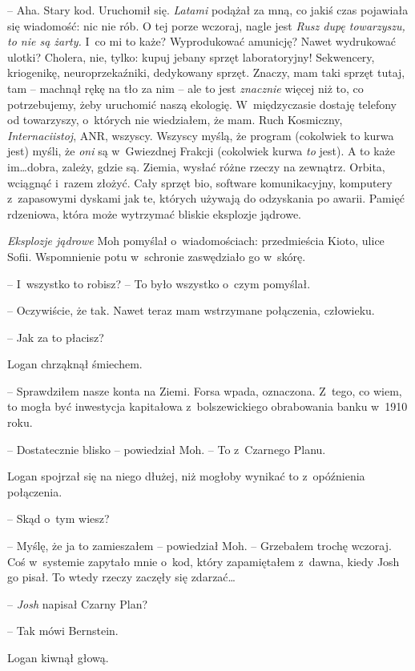 \documentclass[oneside,polish,11pt,sfheadings]{mwbk}
\begin{document}
-- Aha. Stary kod. Uruchomił się. \emph{Latami} podążał za mną, co jakiś
czas pojawiała się wiadomość: nic nie rób. O tej porze wczoraj, nagle
jest \emph{Rusz dupę towarzyszu, to nie są żarty.} I~co mi to każe?
Wyprodukować amunicję? Nawet wydrukować ulotki? Cholera, nie, tylko:
kupuj jebany sprzęt laboratoryjny! Sekwencery, kriogenikę,
neuroprzekaźniki, dedykowany sprzęt. Znaczy, mam taki sprzęt tutaj, tam
-- machnął rękę na tło za nim -- ale to jest \emph{znacznie} więcej niż
to, co potrzebujemy, żeby uruchomić naszą ekologię. W~międzyczasie
dostaję telefony od towarzyszy, o~których nie wiedziałem, że mam. Ruch
Kosmiczny, \emph{Internaciistoj}, ANR, wszyscy. Wszyscy myślą, że
program (cokolwiek to kurwa jest) myśli, że \emph{oni} są w~Gwiezdnej
Frakcji (cokolwiek kurwa \emph{to} jest). A to każe im\ldots dobra, zależy,
gdzie są. Ziemia, wysłać różne rzeczy na zewnątrz. Orbita, wciągnąć i~razem złożyć. Cały sprzęt bio, software komunikacyjny, komputery z~zapasowymi dyskami jak te, których używają do odzyskania po awarii.
Pamięć rdzeniowa, która może wytrzymać bliskie eksplozje jądrowe.

\emph{Eksplozje jądrowe} Moh pomyślał o~wiadomościach: przedmieścia
Kioto, ulice Sofii. Wspomnienie potu w~schronie zaswędziało go w~skórę.

-- I~wszystko to robisz? -- To było wszyst\-ko o~czym pomyślał.

-- Oczywiście, że tak. Nawet teraz mam wstrzymane połączenia, człowieku.

-- Jak za to płacisz?

Logan chrząknął śmiechem. 

-- Sprawdziłem nasze konta na Ziemi. Forsa
wpada, oznaczona. Z~tego, co wiem, to mogła być inwestycja kapitałowa z~bolszewickiego obrabowania banku w~1910 roku.

-- Dostatecznie blisko -- powiedział Moh. -- To z~Czarnego Planu.

Logan spojrzał się na niego dłużej, niż mogłoby wynikać to z~opóźnienia
połączenia.

-- Skąd o~tym wiesz?

-- Myślę, że ja to zamieszałem -- powiedział Moh. -- Grzebałem trochę
wczoraj. Coś w~systemie zapytało mnie o~kod, który zapamiętałem z~dawna,
kiedy Josh go pisał. To wtedy rzeczy zaczęły się zdarzać\ldots

-- \emph{Josh} napisał Czarny Plan?

-- Tak mówi Bernstein.

Logan kiwnął głową. 
\end{document}
